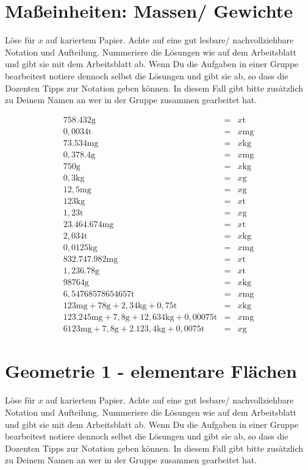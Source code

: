 \documentclass[a4paper]{book}%
\newcommand{\anweisungArbeitsblatt}{Löse für $x$ auf kariertem Papier. Achte auf eine gut lesbare/ nachvollziehbare Notation und Aufteilung. Nummeriere die Lösungen wie auf dem Arbeitsblatt und gibt sie mit dem Arbeitsblatt ab. Wenn Du die Aufgaben in einer Gruppe bearbeitest notiere dennoch selbst die Lösungen und gibt sie ab, so dass die Dozenten Tipps zur Notation geben können. In diesem Fall gibt bitte zusätzlich zu Deinem Namen an wer in der Gruppe zusammen gearbeitet hat.}
\theoremstyle{definition}
\begin{document}
\newpage
\section{Maßeinheiten: Massen/ Gewichte}

\anweisungArbeitsblatt

\begin{eqnarray}
    758.432 \text{g} &=& x \text{t} \\
    0,0034 \text{t} &=& x \text{mg} \\
    73.534 \text{mg} &=& x \text{kg} \\
    0,378.4 \text{g} &=& x \text{mg} \\
    750 \text{g} &=& x \text{kg} \\
    0,3 \text{kg} &=& x \text{g} \\
    12,5 \text{mg} &=& x \text{g} \\
    123 \text{kg} &=& x \text{t} \\
    1,23 \text{t} &=& x \text{g} \\
    23.464.674 \text{mg} &=& x \text{t} \\
    2,034 \text{t} &=& x \text{kg} \\
    0,0125 \text{kg} &=& x \text{mg} \\
  832.747.982\text{mg} &=& x \text{t} \\
  1,236.78 \text{g} &=& x \text{t} \\
  98764\text{g} &=& x \text{kg} \\
  6,54768578654657\text{t} &=& x \text{mg} \\
  123 \text{mg} + 78 \text{g} + 2,34 \text{kg} + 0,75 \text{t} &=& x \text{kg} \\
  123.245 \text{mg} + 7,8 \text{g} + 12,634 \text{kg} + 0,00075 \text{t} &=& x \text{mg} \\
  6123 \text{mg} + 7,8 \text{g} + 2.123,4 \text{kg} + 0,0075 \text{t} &=& x \text{g}
\end{eqnarray}


\newpage
\section{Geometrie 1 - elementare Flächen}

\anweisungArbeitsblatt
\end{document}
